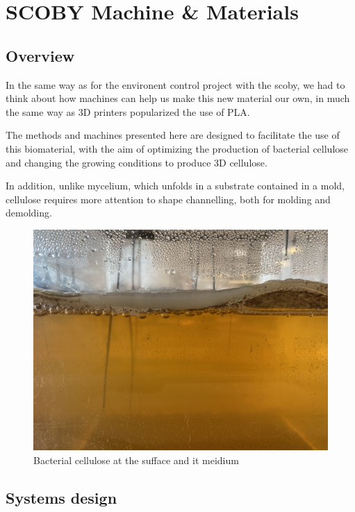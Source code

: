 \chapter{SCOBY Machine \& Materials}


\section{Overview}

In the same way as for the environent control project with the scoby, we had to think about how machines can help us make this new material our own, in much the same way as 3D printers popularized the use of PLA. 

The methods and machines presented here are designed to facilitate the use of this biomaterial, with the aim of optimizing the production of bacterial cellulose and changing the growing conditions to produce 3D cellulose. 

In addition, unlike mycelium, which unfolds in a substrate contained in a mold, cellulose requires more attention to shape channelling, both for molding and demolding. 

\begin{figure}[h]
    \centering
    \includegraphics{images/IMG_4126.jpg}
    \caption{Bacterial cellulose at the sufface and it meidium}
    \label{fig:}
\end{figure} 

\section{Systems design}


